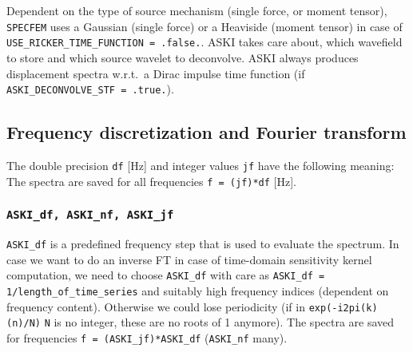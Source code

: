\documentclass[12pt,a4paper]{article}
\newcommand{\lcode}[1]{\nolinkurl{#1}}
\newcommand{\ASKI}{ {\ttfamily ASKI} }
\begin{document}
Dependent on the type of source mechanism (single force, or moment tensor), \lcode{SPECFEM} uses a Gaussian
(single force) or a Heaviside (moment tensor) in case of \lcode{USE_RICKER_TIME_FUNCTION = .false.}. \ASKI{}
takes care about, which wavefield to store and which source wavelet to deconvolve. \ASKI{} always produces
displacement spectra w.r.t.\ a Dirac impulse time function (if \lcode{ASKI_DECONVOLVE_STF = .true.}).

\subsection{Frequency discretization and Fourier transform}
The double precision \lcode{df} [Hz] and integer values \lcode{jf} have the following meaning:
The spectra are saved for all frequencies \lcode{f = (jf)*df} [Hz].
\subsubsection*{\lcode{ASKI_df, ASKI_nf, ASKI_jf}}
\lcode{ASKI_df} is a predefined frequency step that is used to evaluate the spectrum. In case we want to do 
an inverse FT in case of time-domain sensitivity kernel computation, we need to choose \lcode{ASKI_df} with care 
as \lcode{ASKI_df = 1/length_of_time_series} and suitably high frequency indices (dependent on frequency content).
Otherwise we could lose periodicity (if in \lcode{exp(-i2pi(k)(n)/N)} \lcode{N} is no integer, these are no 
roots of 1 anymore). The spectra are saved for frequencies \lcode{f = (ASKI_jf)*ASKI_df} (\lcode{ASKI_nf} many).
\end{document}
